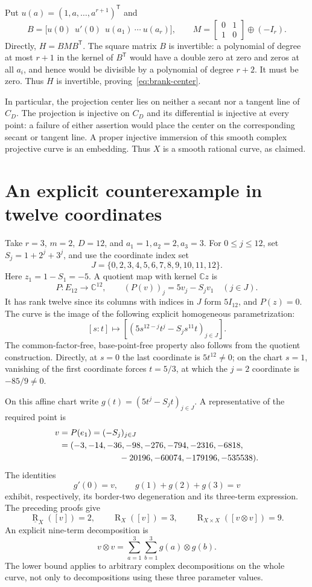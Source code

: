 \documentclass[11pt]{article}
\theoremstyle{remark}\newtheorem{remark}[theorem]{Remark}
\newcommand{\C}{\mathbb C}
\newcommand{\rk}{\operatorname{R}}
\newcommand{\brk}{\underline{\operatorname{R}}}
\begin{document}
Put $u(a)=(1,a,\ldots,a^{r+1})^\mathsf T$ and
\[
 B=\big[u(0)\ \ u'(0)\ \ u(a_1)\ \cdots\ u(a_r)\big],\qquad
 M=\begin{bmatrix}0&1\\1&0\end{bmatrix}\oplus(-I_r).
\]
Directly, $H=BMB^\mathsf T$. The square matrix $B$ is invertible: a polynomial of degree at most $r+1$ in the kernel of $B^\mathsf T$ would have a double zero at zero and zeros at all $a_i$, and hence would be divisible by a polynomial of degree $r+2$. It must be zero. Thus $H$ is invertible, proving~\eqref{eq:brank-center}.

In particular, the projection center lies on neither a secant nor a tangent line of $C_D$. The projection is injective on $C_D$ and its differential is injective at every point: a failure of either assertion would place the center on the corresponding secant or tangent line. A proper injective immersion of this smooth complex projective curve is an embedding. Thus $X$ is a smooth rational curve, as claimed.

\section{An explicit counterexample in twelve coordinates}
Take $r=3$, $m=2$, $D=12$, and $a_1=1,a_2=2,a_3=3$. For $0\leq j\leq12$, set $S_j=1+2^j+3^j$, and use the coordinate index set
\[
 J=\{0,2,3,4,5,6,7,8,9,10,11,12\}.
\]
Here $z_1=1-S_1=-5$. A quotient map with kernel $\C z$ is
\[
 P:E_{12}\longrightarrow\C^{12},\qquad
 (P(v))_j=5v_j-S_jv_1\quad(j\in J).
\]
It has rank twelve since its columns with indices in $J$ form $5I_{12}$, and $P(z)=0$.
The curve is the image of the following explicit homogeneous parametrization:
\begin{equation}\label{eq:explicit-curve}
 [s:t]\longmapsto
 \left[\left(5s^{12-j}t^j-S_js^{11}t\right)_{j\in J}\right].
\end{equation}
The common-factor-free, base-point-free property also follows from the quotient construction. Directly, at $s=0$ the last coordinate is $5t^{12}\neq0$; on the chart $s=1$, vanishing of the first coordinate forces $t=5/3$, at which the $j=2$ coordinate is $-85/9\neq0$.

On this affine chart write $g(t)=(5t^j-S_jt)_{j\in J}$. A representative of the required point is
\begin{align*}
 v&=P(e_1)=(-S_j)_{j\in J}\\
  &=(-3,-14,-36,-98,-276,-794,-2316,-6818,\\
  &\hspace{25mm}-20196,-60074,-179196,-535538).
\end{align*}
The identities
\[
 g'(0)=v,\qquad g(1)+g(2)+g(3)=v
\]
exhibit, respectively, its border-two degeneration and its three-term expression. The preceding proofs give
\[
 \boxed{\brk_X([v])=2,\qquad\rk_X([v])=3,\qquad
 \rk_{X\times X}([v\otimes v])=9.}
\]
An explicit nine-term decomposition is
\[
 v\otimes v=\sum_{a=1}^{3}\sum_{b=1}^{3} g(a)\otimes g(b).
\]
The lower bound applies to arbitrary complex decompositions on the whole curve, not only to decompositions using these three parameter values.
\end{document}
